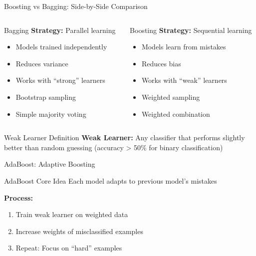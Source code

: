 \documentclass[10pt]{beamer}
\begin{document}
\begin{frame}{Boosting vs Bagging: Side-by-Side Comparison}
\begin{columns}
\begin{column}{0.48\textwidth}
\begin{alertbox}{Bagging}
\textbf{Strategy:} Parallel learning
\begin{itemize}
\item Models trained independently
\item Reduces variance
\item Works with ``strong'' learners
\item Bootstrap sampling
\item Simple majority voting
\end{itemize}
\end{alertbox}
\end{column}

\begin{column}{0.48\textwidth}
\begin{keypointsbox}{Boosting}
\textbf{Strategy:} Sequential learning
\begin{itemize}
\item Models learn from mistakes
\item Reduces bias
\item Works with ``weak'' learners
\item Weighted sampling
\item Weighted combination
\end{itemize}
\end{keypointsbox}
\end{column}
\end{columns}

\begin{definitionbox}{Weak Learner Definition}
\small{\textbf{Weak Learner:} Any classifier that performs slightly better than random guessing (accuracy > 50\% for binary classification)}
\end{definitionbox}
\end{frame}

\begin{frame}{AdaBoost: Adaptive Boosting}
\begin{definitionbox}{AdaBoost Core Idea}
Each model adapts to previous model's mistakes
\end{definitionbox}

\begin{keypointsbox}
\textbf{Process:}
\begin{enumerate}
\item Train weak learner on weighted data
\item Increase weights of misclassified examples
\item Repeat: Focus on ``hard'' examples
\end{enumerate}
\end{keypointsbox}
\end{frame}
\end{document}
